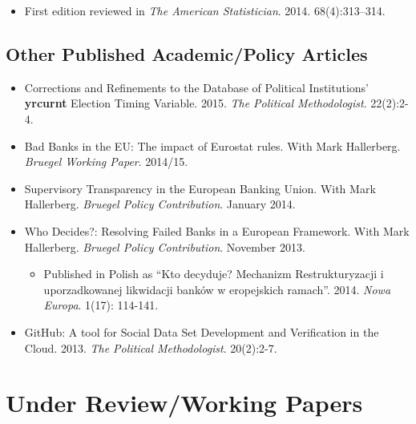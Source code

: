 \documentclass[a4paper]{article}
\begin{document}
{\begin{itemize}
        \begin{itemize}
            \item First edition reviewed in \emph{The American Statistician}. 2014. 68(4):313--314.
        \end{itemize}

\end{itemize}

\subsection*{Other Published Academic/Policy Articles}

\begin{itemize}

    \item Corrections and Refinements to the Database of Political Institutions' \textbf{yrcurnt} Election Timing Variable. 2015. {\emph{The Political Methodologist}}. 22(2):2-4.

    \item Bad Banks in the EU: The impact of Eurostat rules. With Mark Hallerberg. \emph{Bruegel Working Paper}. 2014/15.

    \item Supervisory Transparency in the European Banking Union. With Mark Hallerberg. {\emph{Bruegel Policy Contribution}}. January 2014.

    \item Who Decides?: Resolving Failed Banks in a European Framework. With Mark Hallerberg. {\emph{Bruegel Policy Contribution}}. November 2013.

      \begin{itemize}
        \item Published in Polish as ``Kto decyduje? Mechanizm Restrukturyzacji i uporzadkowanej likwidacji bank\'{o}w w eropejskich ramach''. 2014. \emph{Nowa Europa}. 1(17): 114-141.
      \end{itemize}

    \item GitHub: A tool for Social Data Set Development and Verification in the Cloud. 2013. {\emph{The Political Methodologist}}. 20(2):2-7.

\end{itemize}


\section*{Under Review/Working Papers}

}
\end{document}
